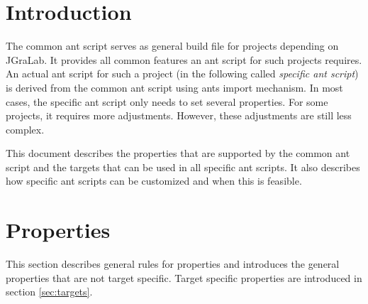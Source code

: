 \documentclass[a4paper,twoside,11pt,bibtotoc]{article}
\begin{document}
\sloppy

\begin{titlepage}



\end{titlepage}




\section{Introduction}
The common ant script serves as general build file for projects depending on JGraLab.
It provides all common features an ant script for such projects requires.
An actual ant script for such a project (in the following called \emph{specific ant script}) is derived from the common ant script using ants import mechanism.
In most cases, the specific ant script only needs to set several properties.
For some projects, it requires more adjustments.
However, these adjustments are still less complex.

This document describes the properties that are supported by the common ant script and the targets that can be used in all specific ant scripts.
It also describes how specific ant scripts can be customized and when this is feasible.

\section{Properties}
\label{sec:properties}
This section describes general rules for properties and introduces the general properties that are not target specific.
Target specific properties are introduced in section \ref{sec:targets}.
\end{document}
